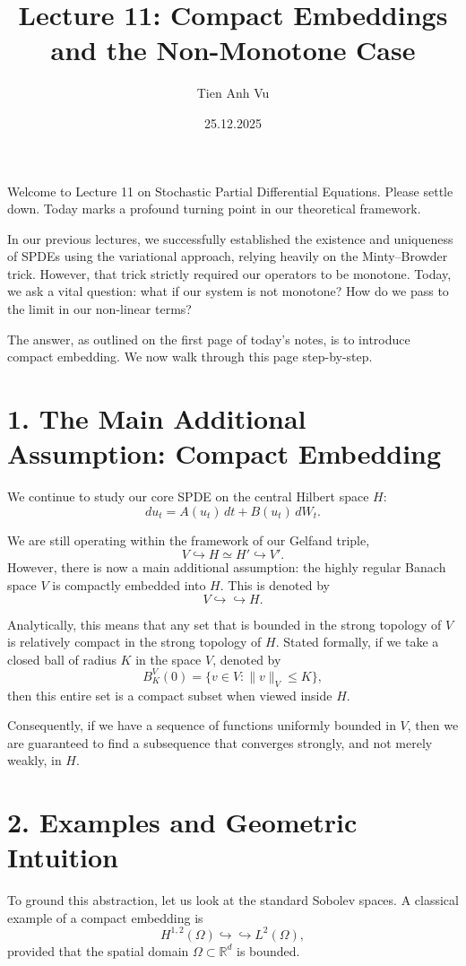 \documentclass[11pt]{article}
\title{Lecture 11: Compact Embeddings and the Non-Monotone Case}
\date{25.12.2025}
\author{Tien Anh Vu}
\theoremstyle{definition}
\theoremstyle{remark}
\begin{document}
\maketitle

Welcome to Lecture 11 on Stochastic Partial Differential Equations. Please settle down. Today marks a profound turning point in our theoretical framework.

In our previous lectures, we successfully established the existence and uniqueness of SPDEs using the variational approach, relying heavily on the Minty--Browder trick. However, that trick strictly required our operators to be monotone. Today, we ask a vital question: what if our system is not monotone? How do we pass to the limit in our non-linear terms?

The answer, as outlined on the first page of today's notes, is to introduce compact embedding. We now walk through this page step-by-step.

\section*{1. The Main Additional Assumption: Compact Embedding}
We continue to study our core SPDE on the central Hilbert space $H$:
\[
  du_t = A(u_t)\,dt + B(u_t)\,dW_t.
\]

We are still operating within the framework of our Gelfand triple,
\[
  V \hookrightarrow H \simeq H' \hookrightarrow V'.
\]
However, there is now a main additional assumption: the highly regular Banach space $V$ is compactly embedded into $H$. This is denoted by
\[
  V \hookrightarrow \hookrightarrow H.
\]

Analytically, this means that any set that is bounded in the strong topology of $V$ is relatively compact in the strong topology of $H$. Stated formally, if we take a closed ball of radius $K$ in the space $V$, denoted by
\[
  B_K^V(0)=\{v\in V:\|v\|_V\le K\},
\]
then this entire set is a compact subset when viewed inside $H$.

Consequently, if we have a sequence of functions uniformly bounded in $V$, then we are guaranteed to find a subsequence that converges strongly, and not merely weakly, in $H$.

\section*{2. Examples and Geometric Intuition}
To ground this abstraction, let us look at the standard Sobolev spaces. A classical example of a compact embedding is
\[
  H^{1,2}(\Omega) \hookrightarrow \hookrightarrow L^2(\Omega),
\]
provided that the spatial domain $\Omega\subset \mathbb{R}^d$ is bounded.
\end{document}
